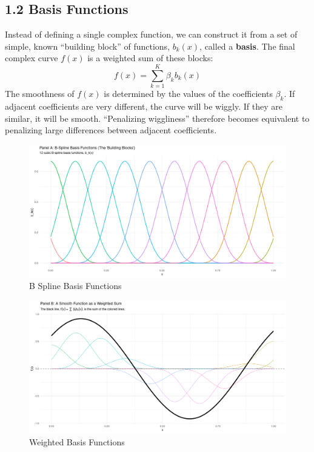 \documentclass[11pt, a4paper]{article}
\begin{document}
\subsection{1.2 Basis Functions}
Instead of defining a single complex function, we can construct it from a set of simple, known ``building block'' of functions, $b_k(x)$, called a \textbf{basis}. The final complex curve $f(x)$ is a weighted sum of these blocks:
\[ f(x) = \sum_{k=1}^{K} \beta_k b_k(x) \]
The smoothness of $f(x)$ is determined by the values of the coefficients $\beta_k$. If adjacent coefficients are very different, the curve will be wiggly. If they are similar, it will be smooth. ``Penalizing wiggliness'' therefore becomes equivalent to penalizing large differences between adjacent coefficients.
\begin{figure}
 \centering
 \includegraphics[width=\linewidth]{b-splines.png}
 \caption{B Spline Basis Functions}
 \label{fig:enter-label}
\end{figure}

\begin{figure}
 \centering
 \includegraphics[width=1\linewidth]{weighted.png}
 \caption{Weighted Basis Functions}
 \label{fig:enter-label}
\end{figure}
\end{document}
